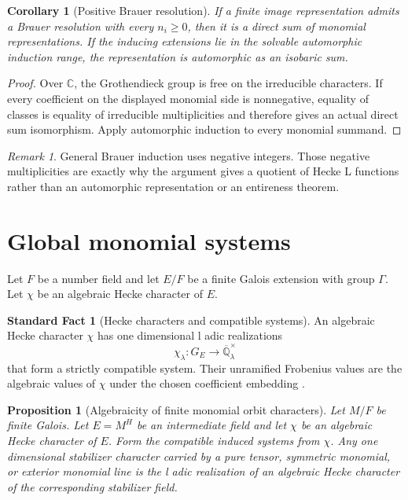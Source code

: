\documentclass{aomart}
\newtheorem{proposition}[proposition]{Proposition}
\newtheorem{corollary}[corollary]{Corollary}
\theoremstyle{definition}
\newtheorem{standardfact}[standardfact]{Standard Fact}
\theoremstyle{remark}
\newtheorem{remark}[remark]{Remark}
\newcommand{\CC}{\mathbb C}
\newcommand{\QQ}{\mathbb Q}
\begin{document}
\begin{corollary}[Positive Brauer resolution]\label{cor:positive_brauer}
If a finite image representation admits a Brauer resolution with every \(n_i\geq0\), then it is a direct sum of monomial representations. If the inducing extensions lie in the solvable automorphic induction range, the representation is automorphic as an isobaric sum.
\end{corollary}

\begin{proof}
Over \(\CC\), the Grothendieck group is free on the irreducible characters. If every coefficient on the displayed monomial side is nonnegative, equality of classes is equality of irreducible multiplicities and therefore gives an actual direct sum isomorphism. Apply automorphic induction to every monomial summand.
\end{proof}

\begin{remark}\label{rem:brauer_negative}
General Brauer induction uses negative integers. Those negative multiplicities are exactly why the argument gives a quotient of Hecke L functions rather than an automorphic representation or an entireness theorem.
\end{remark}


\section{Global monomial systems}\label{sec:global}

Let \(F\) be a number field and let \(E/F\) be a finite Galois extension with group \(\Gamma\). Let \(\chi\) be an algebraic Hecke character of \(E\).

\begin{standardfact}[Hecke characters and compatible systems]\label{fact:hecke_compatible}
An algebraic Hecke character \(\chi\) has one dimensional l adic realizations
\[
\chi_\lambda:G_E\longrightarrow\overline{\QQ}_\lambda^{\times}
\]
that form a strictly compatible system. Their unramified Frobenius values are the algebraic values of \(\chi\) under the chosen coefficient embedding \cite{Tate1979,Weil1967,Neukirch1999}.
\end{standardfact}

\begin{proposition}[Algebraicity of finite monomial orbit characters]\label{prop:general_orbit_algebraicity}
Let \(M/F\) be finite Galois. Let \(E=M^H\) be an intermediate field and let \(\chi\) be an algebraic Hecke character of \(E\). Form the compatible induced systems from \(\chi\). Any one dimensional stabilizer character carried by a pure tensor, symmetric monomial, or exterior monomial line is the l adic realization of an algebraic Hecke character of the corresponding stabilizer field.
\end{proposition}
\end{document}
